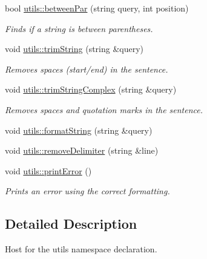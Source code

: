 \begin{DoxyCompactItemize}
bool \hyperlink{namespaceutils_a1e1de2e5772bffdfe2c8d3309a61ddab}{utils\+::between\+Par} (string query, int position)
\begin{DoxyCompactList}\small\item\em Finds if a string is between parentheses. \end{DoxyCompactList}\item 
void \hyperlink{namespaceutils_a9f184d101ac739ab058355ab5413ca9a}{utils\+::trim\+String} (string \&query)
\begin{DoxyCompactList}\small\item\em Removes spaces (start/end) in the sentence. \end{DoxyCompactList}\item 
void \hyperlink{namespaceutils_a0362c7510f0bb0c4449031f897626696}{utils\+::trim\+String\+Complex} (string \&query)
\begin{DoxyCompactList}\small\item\em Removes spaces and quotation marks in the sentence. \end{DoxyCompactList}\item 
void \hyperlink{namespaceutils_a8b0beed284a3321a1f9a08e23bdb3611}{utils\+::format\+String} (string \&query)
\item 
void \hyperlink{namespaceutils_adf961974462ef6e8d7ccc32311397d75}{utils\+::remove\+Delimiter} (string \&line)
\item 
void \hyperlink{namespaceutils_afd76dd21b41c50ce7396e30fb5d8d75b}{utils\+::print\+Error} ()
\begin{DoxyCompactList}\small\item\em Prints an error using the correct formatting. \end{DoxyCompactList}\end{DoxyCompactItemize}


\subsection{Detailed Description}
Host for the utils namespace declaration. 

